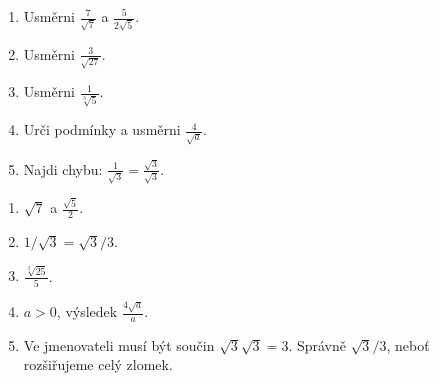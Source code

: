 \documentclass[11pt,a4paper]{article}
\begin{document}

\begin{zadaniReseniBox}[title={Domácí úlohy},breakable=false]
\begin{enumerate}[label=\alph*)]
\item Usměrni $\frac7{\sqrt7}$ a $\frac5{2\sqrt5}$.
\item Usměrni $\frac3{\sqrt{27}}$.
\item Usměrni $\frac1{\sqrt[3]5}$.
\item Urči podmínky a usměrni $\frac4{\sqrt a}$.
\item Najdi chybu: $\frac1{\sqrt3}=\frac{\sqrt3}{\sqrt3}$.
\end{enumerate}
\tcblower
\begin{enumerate}[label=\alph*)]
\item $\sqrt7$ a $\frac{\sqrt5}2$.
\item $1/\sqrt3=\sqrt3/3$.
\item $\frac{\sqrt[3]{25}}5$.
\item $a>0$, výsledek $\frac{4\sqrt a}{a}$.
\item Ve jmenovateli musí být součin $\sqrt3\sqrt3=3$. Správně $\sqrt3/3$, neboť rozšiřujeme celý zlomek.
\end{enumerate}
\end{zadaniReseniBox}
\end{document}
